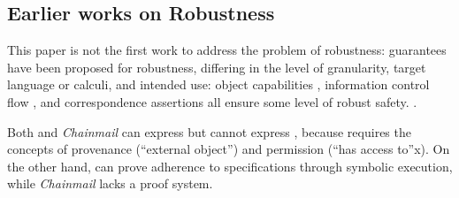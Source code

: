 {%
\vspace{.04in}
 
 \subsection{Earlier works on Robustness} 
This paper is not the first work to address the problem of robustness:
 guarantees have been proposed for  robustness, differing in the level 
of granularity,   target  language or calculi, and intended use:
object capabilities  \cite{MillerPhD, dd, threoremsFreeSep}, 
information control flow \cite{Zdancewic:Myers:01,noninteferenceOS}, 
and correspondence assertions \cite{Maffeis:aiamb:thesis00}
all
ensure some level of robust safety. 
.
 

  Both {} \cite{VerX} and  \emph{Chainmail} \cite{FASE} can express \SrobustA but
  {}  cannot express \SrobustB, because 
\SrobustB  requires the concepts of provenance (``external object'') and
  permission (``has access to''x).
On the other hand, {} can prove adherence to  specifications through symbolic 
  execution, while  \emph{Chainmail}   lacks a proof system. 
  
\vspace{.04in}

}
